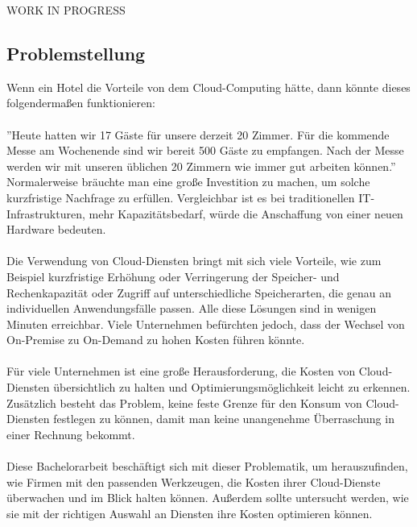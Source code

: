 WORK IN PROGRESS\\
\subsection{Problemstellung}
Wenn ein Hotel die Vorteile von dem Cloud-Computing hätte, dann könnte dieses folgendermaßen funktionieren:
\\\\
”Heute hatten wir 17 Gäste für unsere derzeit 20 Zimmer. Für die kommende Messe am Wochenende sind wir bereit 500 Gäste zu empfangen. Nach der Messe werden wir mit unseren üblichen 20 Zimmern wie immer gut arbeiten können.”
Normalerweise bräuchte man eine große Investition zu machen, um solche kurzfristige Nachfrage zu erfüllen. Vergleichbar ist es bei traditionellen IT-Infrastrukturen, mehr Kapazitätsbedarf, würde die Anschaffung von einer neuen Hardware bedeuten.
\\\\
Die Verwendung von Cloud-Diensten bringt mit sich viele Vorteile, wie zum Beispiel kurzfristige Erhöhung oder Verringerung der Speicher- und Rechenkapazität oder Zugriff auf unterschiedliche Speicherarten, die genau an individuellen Anwendungsfälle passen. Alle diese Lösungen sind in wenigen Minuten erreichbar. Viele Unternehmen befürchten jedoch, dass der Wechsel von On-Premise zu On-Demand zu hohen Kosten führen könnte.
\\\\
Für viele Unternehmen ist eine große Herausforderung, die Kosten von Cloud-Diensten übersichtlich zu halten und Optimierungsmöglichkeit leicht zu erkennen. Zusätzlich besteht das Problem, keine feste Grenze für den Konsum von Cloud-Diensten festlegen zu können, damit man keine unangenehme Überraschung in einer Rechnung bekommt. 
\\\\
Diese Bachelorarbeit beschäftigt sich mit dieser Problematik, um herauszufinden, wie Firmen mit den passenden Werkzeugen, die Kosten ihrer Cloud-Dienste überwachen und im Blick halten können. Außerdem sollte untersucht werden, wie sie mit der richtigen Auswahl an Diensten ihre Kosten optimieren können.
\newpage

